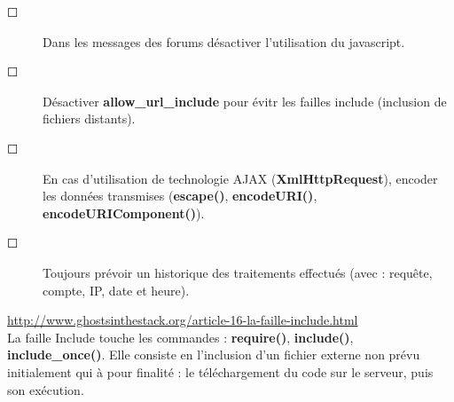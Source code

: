 \documentclass[a4paper,11pt]{article}				    %
\begin{document}
{\begin{description}
   \item[$\Square$] Dans les messages des forums d\'esactiver l'utilisation du javascript.
	\item[$\Square$] D\'esactiver \textbf{allow\_url\_include} pour \'evitr les failles include (inclusion de fichiers distants).
	\item[$\Square$] En cas d'utilisation de technologie AJAX (\textbf{XmlHttpRequest}), encoder les donn\'ees transmises (\textbf{escape()}, \textbf{encodeURI()}, \textbf{encodeURIComponent()}).
   \item[$\Square$] Toujours pr\'evoir un historique des traitements effectu\'es (avec : requ\^ete, compte, IP, date et heure).
\end{description}
}
{
\url{http://www.ghostsinthestack.org/article-16-la-faille-include.html}
}
{
\\La faille Include touche les commandes : \textbf{\color{blue}require()}, \textbf{\color{blue}include()}, \textbf{\color{blue}include\_once()}.
Elle consiste en l'inclusion d'un fichier externe non pr\'evu initialement qui \`a pour finalit\'e : le t\'el\'echargement du code sur le serveur, puis son ex\'ecution.
}
\end{document}
